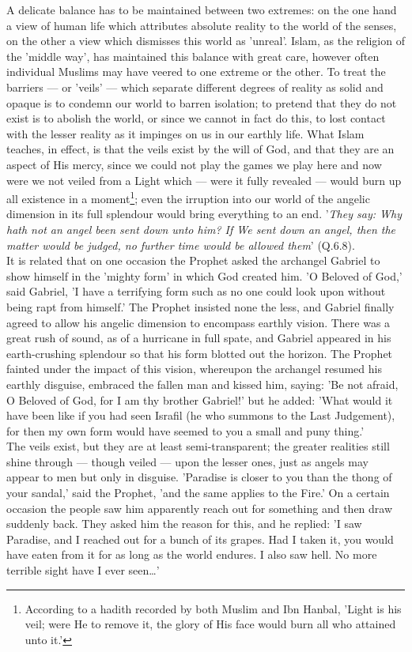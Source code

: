 \documentclass[11pt, b5paper, twoside]{book}
\begin{document}
A delicate balance has to be maintained between two extremes: on the one hand a view of human life 
which attributes absolute reality to the world of the senses, on the other a view which dismisses 
this world as 'unreal'. Islam, as the religion of the 'middle way', has maintained this balance with 
great care, however often individual Muslims may have veered to one extreme or the other. To treat 
the barriers --- or 'veils' --- which separate different degrees of reality as solid and opaque is to 
condemn our world to barren isolation; to pretend that they do not exist is to abolish the world, or 
since we cannot in fact do this, to lost contact with the lesser reality as it impinges on us in our 
earthly life. What Islam teaches, in effect, is that the veils exist by the will of God, and that 
they are an aspect of His mercy, since we could not play the games we play here and now were we not 
veiled from a Light which --- were it fully revealed --- would burn up all existence in a moment\footnote{According to a hadith recorded by both Muslim and Ibn Hanbal, 'Light is his veil; were He to remove 
it, the glory of His face would burn all who attained unto it.'}; even 
the irruption into our world of the angelic dimension in its full splendour would bring everything to 
an end. '\emph{They say: Why hath not an angel been sent down unto him? If We sent down an angel, then the 
matter would be judged, no further time would be allowed them}' (Q.6.8). \\

It is related that on one occasion the Prophet asked the archangel Gabriel to show himself in the 
'mighty form' in which God created him. 'O Beloved of God,' said Gabriel, 'I have a terrifying form 
such as no one could look upon without being rapt from himself.' The Prophet insisted none the less, 
and Gabriel finally agreed to allow his angelic dimension to encompass earthly vision. There was a 
great rush of sound, as of a hurricane in full spate, and Gabriel appeared in his earth-crushing 
splendour so that his form blotted out the horizon. The Prophet fainted under the impact of this 
vision, whereupon the archangel resumed his earthly disguise, embraced the fallen man and kissed him, 
saying: 'Be not afraid, O Beloved of God, for I am thy brother Gabriel!' but he added: 'What would it 
have been like if you had seen Israfil (he who summons to the Last Judgement), for then my own form 
would have seemed to you a small and puny thing.' \\

The veils exist, but they are at least semi-transparent; the greater realities still shine through --- 
though veiled --- upon the lesser ones, just as angels may appear to men but only in disguise. 
'Paradise is closer to you than the thong of your sandal,' said the Prophet, 'and the same applies to 
the Fire.' On a certain occasion the people saw him apparently reach out for something and then draw 
suddenly back. They asked him the reason for this, and he replied: 'I saw Paradise, and I reached out 
for a bunch of its grapes. Had I taken it, you would have eaten from it for as long as the world 
endures. I also saw hell. No more terrible sight have I ever seen\ldots{}' \\
\end{document}
